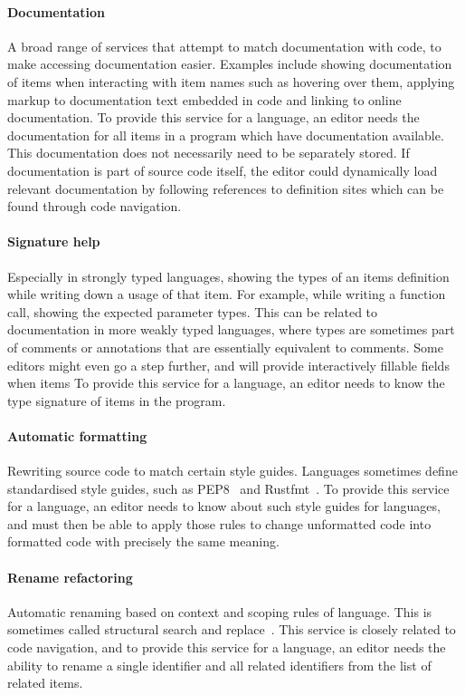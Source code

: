 \paragraph{Documentation}
A broad range of services that attempt to match documentation with code, to make accessing documentation easier.
Examples include showing documentation of items when interacting with item names such as hovering over them,
applying markup to documentation text embedded in code and linking to online documentation.
To provide this service for a language, an editor needs the documentation for all items in a program which have documentation available.
This documentation does not necessarily need to be separately stored.
If documentation is part of source code itself, the editor could dynamically load relevant documentation by following references to definition sites which can be found through code navigation.

\paragraph{Signature help}
Especially in strongly typed languages, showing the types of an items definition while writing down a usage of that item.
For example, while writing a function call, showing the expected parameter types.
This can be related to documentation in more weakly typed languages, where types are sometimes part of comments or annotations that are essentially equivalent to comments.
Some editors might even go a step further, and will provide interactively fillable fields when items
To provide this service for a language, an editor needs to know the type signature of items in the program.

\paragraph{Automatic formatting}
Rewriting source code to match certain style guides.
Languages sometimes define standardised style guides, such as PEP8~\autocite*{pep8} and Rustfmt~\autocite{rustfmt}.
To provide this service for a language, an editor needs to know about such style guides for languages, and must then be able to apply those rules to change unformatted code into formatted code with precisely the same meaning.

\paragraph{Rename refactoring}
Automatic renaming based on context and scoping rules of language.
This is sometimes called structural search and replace~\autocite{jetbrains_ssr}.
This service is closely related to code navigation, and to provide this service for a language, an editor needs the ability to rename a single
identifier and all related identifiers from the list of related items.

